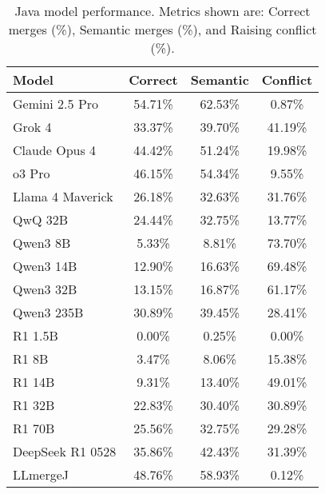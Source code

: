 \begin{table}[ht]
\centering
\footnotesize
\begin{tabular}{lccc}
\toprule
Model & Correct & Semantic & Conflict \\
\midrule
Gemini 2.5 Pro & 54.71\% & 62.53\% & 0.87\% \\
Grok 4 & 33.37\% & 39.70\% & 41.19\% \\
Claude Opus 4 & 44.42\% & 51.24\% & 19.98\% \\
o3 Pro & 46.15\% & 54.34\% & 9.55\% \\
Llama 4 Maverick & 26.18\% & 32.63\% & 31.76\% \\
QwQ 32B & 24.44\% & 32.75\% & 13.77\% \\
Qwen3 8B & 5.33\% & 8.81\% & 73.70\% \\
Qwen3 14B & 12.90\% & 16.63\% & 69.48\% \\
Qwen3 32B & 13.15\% & 16.87\% & 61.17\% \\
Qwen3 235B & 30.89\% & 39.45\% & 28.41\% \\
R1 1.5B & 0.00\% & 0.25\% & 0.00\% \\
R1 8B & 3.47\% & 8.06\% & 15.38\% \\
R1 14B & 9.31\% & 13.40\% & 49.01\% \\
R1 32B & 22.83\% & 30.40\% & 30.89\% \\
R1 70B & 25.56\% & 32.75\% & 29.28\% \\
DeepSeek R1 0528 & 35.86\% & 42.43\% & 31.39\% \\
LLmergeJ & 48.76\% & 58.93\% & 0.12\% \\
\bottomrule
\end{tabular}
\caption{Java model performance. Metrics shown are: Correct merges (\%), Semantic merges (\%), and Raising conflict (\%).}
\label{tab:java-results}
\end{table}
